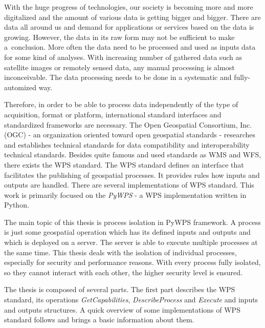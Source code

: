  With the huge progress of technologies, our
society is becoming more and more digitalized and the amount of
various data is getting bigger and bigger. There are data all around
us and demand for applications or services based on the data is
growing. However, the data in its raw form may not be sufficient to
make a~conclusion. More often the data need to be processed and used
as inputs data for some kind of ana\-lyses. With increasing number of
gathered data such as satellite images or remotely sensed data, any
manual processing is almost inconceivable. The data processing needs
to be done in a systematic and fully-automized way.

Therefore, in order to be able to process data independently of the
type of acquisition, format or platform, international standard
interfaces and standardized frameworks are necessary. The Open
Geospatial Consortium, Inc.  (OGC) - an organization oriented toward
open geospatial standards - researches and establishes technical
standards for data compatibility and interoperability technical
standards. Besides quite famous and used standards as WMS and WFS,
there exists the WPS standard. The WPS standard defines an interface
that facilitates the publishing of geospatial processes. It provides
rules how inputs and outputs are handled. 
There are several implementations of WPS standard. This work is primarily focused
on the \textit{PyWPS} - a WPS implementation written in Python.

\bigskip
The main topic of this thesis is process isolation in PyWPS framework. A process is just some geospatial operation which 
has its defined inputs and outputs and which is deployed on a server. The server is able to execute multiple 
processes at the same time. This thesis deals with the isolation of individual processes, especially for security and 
performance reasons. With every process fully isolated, so they cannot interact with each other, the higher security 
level is ensured.

The thesis is composed of several parts. The first part describes the WPS standard, its operations 
\textit{GetCapabilities}, \textit{DescribeProcess} and \textit{Execute} and inputs and outputs structures. A quick
overview of some implementations of WPS standard follows and brings a basic information about them.

